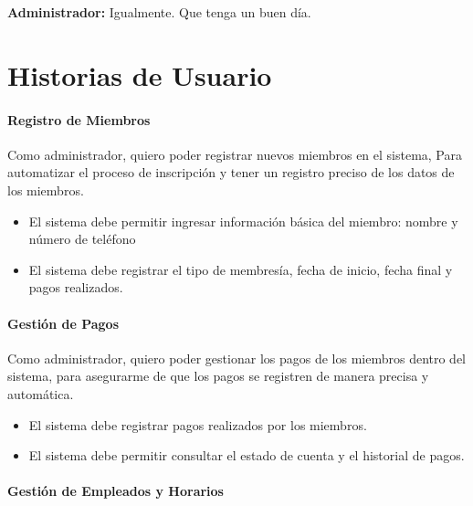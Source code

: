 \documentclass[spanish, 12pt]{article}
\providecommand{\tightlist}{\setlength{\itemsep}{0pt}
\setlength{\parskip}{0pt}}
\begin{document}
	\textbf{Administrador:} Igualmente. Que tenga un buen día.

	\section{Historias de Usuario}
	\label{historias-de-usuario-1}

	\paragraph{Registro de Miembros}
	\label{registro-de-miembros-1}

	Como administrador, quiero poder registrar nuevos miembros en el sistema, Para
	automatizar el proceso de inscripción y tener un registro preciso de los datos
	de los miembros.

	\begin{itemize}
		\tightlist

		\item El sistema debe permitir ingresar información básica del miembro:
			nombre y número de teléfono

		\item El sistema debe registrar el tipo de membresía, fecha de inicio, fecha
			final y pagos realizados.
	\end{itemize}

	\paragraph{Gestión de Pagos}
	\label{gestiuxf3n-de-pagos}

	Como administrador, quiero poder gestionar los pagos de los miembros dentro del
	sistema, para asegurarme de que los pagos se registren de manera precisa y
	automática.

	\begin{itemize}
		\tightlist

		\item El sistema debe registrar pagos realizados por los miembros.

		\item El sistema debe permitir consultar el estado de cuenta y el historial de
			pagos.
	\end{itemize}

	\paragraph{Gestión de Empleados y Horarios}
	\label{gestiuxf3n-de-empleados-y-horarios}
\end{document}
